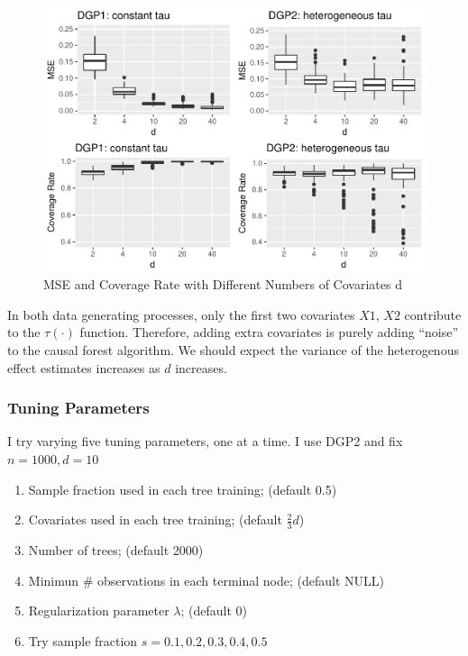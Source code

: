 \documentclass[]{article}
\begin{document}
\begin{figure}
\centering
\includegraphics{report_files/figure-latex/fig3-1.pdf}
\caption{\label{fig:fig3}MSE and Coverage Rate with Different Numbers of
Covariates d}
\end{figure}

In both data generating processes, only the first two covariates \(X1\),
\(X2\) contribute to the \(\tau(\cdot)\) function. Therefore, adding
extra covariates is purely adding ``noise'' to the causal forest
algorithm. We should expect the variance of the heterogenous effect
estimates increases as \(d\) increases.

\subsubsection{Tuning Parameters}\label{tuning-parameters}

I try varying five tuning parameters, one at a time. I use DGP2 and fix
\(n=1000, d=10\)

\begin{enumerate}
\def\labelenumi{\arabic{enumi}.}
\item
  Sample fraction used in each tree training; (default 0.5)
\item
  Covariates used in each tree training; (default \(\frac{2}{3}d\))
\item
  Number of trees; (default 2000)
\item
  Minimun \# observations in each terminal node; (default NULL)
\item
  Regularization parameter \(\lambda\); (default 0)
\item
  Try sample fraction \(s = 0.1, 0.2, 0.3, 0.4, 0.5\)
\end{enumerate}
\end{document}
